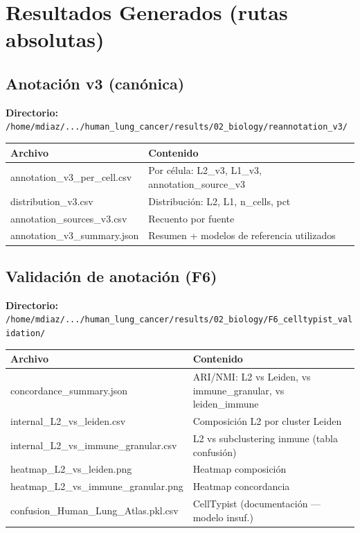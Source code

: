 \documentclass[11pt,a4paper]{article}
\begin{document}
\newpage
\section{Resultados Generados (rutas absolutas)}

\subsection{Anotación v3 (canónica)}
\textbf{Directorio:} \texttt{\small /home/mdiaz/.../human\_lung\_cancer/results/02\_biology/reannotation\_v3/}

\begin{tabular}{|>{\ttfamily}l|p{6.5cm}|}
\hline
\rowcolor{lightgray}\textbf{Archivo} & \textbf{Contenido} \\
\hline
annotation\_v3\_per\_cell.csv & Por célula: L2\_v3, L1\_v3, annotation\_source\_v3 \\
distribution\_v3.csv & Distribución: L2, L1, n\_cells, pct \\
annotation\_sources\_v3.csv & Recuento por fuente \\
annotation\_v3\_summary.json & Resumen + modelos de referencia utilizados \\
\hline
\end{tabular}

\subsection{Validación de anotación (F6)}
\textbf{Directorio:} \texttt{\small /home/mdiaz/.../human\_lung\_cancer/results/02\_biology/F6\_celltypist\_validation/}

\begin{tabular}{|>{\ttfamily}l|p{6.5cm}|}
\hline
\rowcolor{lightgray}\textbf{Archivo} & \textbf{Contenido} \\
\hline
concordance\_summary.json & ARI/NMI: L2 vs Leiden, vs immune\_granular, vs leiden\_immune \\
internal\_L2\_vs\_leiden.csv & Composición L2 por cluster Leiden \\
internal\_L2\_vs\_immune\_granular.csv & L2 vs subclustering inmune (tabla confusión) \\
heatmap\_L2\_vs\_leiden.png & Heatmap composición \\
heatmap\_L2\_vs\_immune\_granular.png & Heatmap concordancia \\
confusion\_Human\_Lung\_Atlas.pkl.csv & CellTypist (documentación — modelo insuf.) \\
\hline
\end{tabular}
\end{document}
